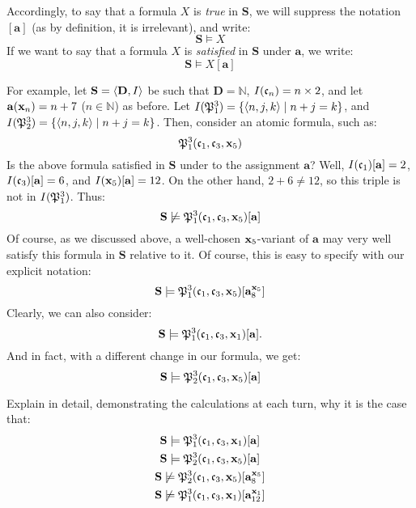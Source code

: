 Accordingly, to say that a formula $X$ is \textit{true} in $\mathbf{S}$, we will suppress the notation $[\mathbf{a}]$ (as by definition, it is irrelevant), and write: 
\[
\mathbf{S} \models X
\]
If we want to say that a formula $X$ is \textit{satisfied} in $\mathbf{S}$ under $\mathbf{a}$, we write: 
\[
\mathbf{S} \models X[\mathbf{a}]
\]


For example, let $\mathbf{S}=\langle\mathbf{D}, I\rangle$ be such that $\mathbf{D}=\mathbb{N}$, $I(\mathfrak{c}_{n})=n \times 2$, and let $\mathbf{a}(\mathbf{x}_{n})= n + 7$ ($n \in \mathbb{N}$) as before. Let $I(\mathfrak{P}^{3}_{1})=\{\langle n, j, k\rangle\mid n+j=k\}$, and $I(\mathfrak{P}^{3}_{2})=\{\langle n, j, k\rangle\mid n+j=k\}$. Then, consider an atomic formula, such as:
\[
\mathfrak{P}^{3}_{1}(\mathfrak{c}_{1}, \mathfrak{c}_{3}, \mathbf{x}_{5})
\]
Is the above formula satisfied in $\mathbf{S}$ under to the assignment $\mathbf{a}$? Well, $I(\mathfrak{c}_{1})[\mathbf{a}]=2$, $I(\mathfrak{c}_{3})[\mathbf{a}]=6$, and $I(\mathbf{x}_{5})[\mathbf{a}]=12$. On the other hand, $2+6\neq 12$, so this triple is not in $I(\mathfrak{P}^{3}_{1})$. Thus: 
\[
\mathbf{S} \not\models \mathfrak{P}^{3}_{1}(\mathfrak{c}_{1}, \mathfrak{c}_{3}, \mathbf{x}_{5})[\mathbf{a}]
\]
Of course, as we discussed above, a well-chosen $\mathbf{x}_{5}$-variant of $\mathbf{a}$ may very well satisfy this formula in $\mathbf{S}$ relative to it. Of course, this is easy to specify with our explicit notation: 
\[
\mathbf{S} \models \mathfrak{P}^{3}_{1}(\mathfrak{c}_{1}, \mathfrak{c}_{3}, \mathbf{x}_{5})[\mathbf{a}^{\mathbf{x}_{5}}_8]
\]
Clearly, we can also consider: 
\[
\mathbf{S} \models \mathfrak{P}^{3}_{1}(\mathfrak{c}_{1}, \mathfrak{c}_{3}, \mathbf{x}_{1})[\mathbf{a}].
\]
And in fact, with a different change in our formula, we get: 
\[
\mathbf{S} \models \mathfrak{P}^{3}_{2}(\mathfrak{c}_{1}, \mathfrak{c}_{3}, \mathbf{x}_{5})[\mathbf{a}]
\]
\begin{exc}
Explain in detail, demonstrating the calculations at each turn, why it is the case that: 
\begin{gather}
\mathbf{S} \models \mathfrak{P}^{3}_{1}(\mathfrak{c}_{1}, \mathfrak{c}_{3}, \mathbf{x}_{1})[\mathbf{a}]\\
\mathbf{S} \models \mathfrak{P}^{3}_{2}(\mathfrak{c}_{1}, \mathfrak{c}_{3}, \mathbf{x}_{5})[\mathbf{a}]\\
\mathbf{S} \not\models \mathfrak{P}^{3}_{2}(\mathfrak{c}_{1}, \mathfrak{c}_{3}, \mathbf{x}_{5})[\mathbf{a}^{\mathbf{x}_{5}}_8]\\
\mathbf{S} \not\models \mathfrak{P}^{3}_{1}(\mathfrak{c}_{1}, \mathfrak{c}_{3}, \mathbf{x}_{1})[\mathbf{a}^{\mathbf{x}_{1}}_{12}]
\end{gather}
\end{exc}

